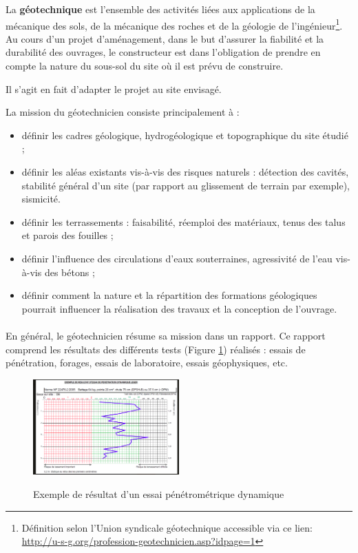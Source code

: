 \par 
La \textbf{géotechnique} est l’ensemble des 
activités liées aux applications de la mécanique des sols, de la mécanique 
des roches et de la géologie de l’ingénieur\footnote{
    Définition selon l’Union syndicale géotechnique accessible via ce lien: 
    \url{http://u-s-g.org/profession-geotechnicien.asp?idpage=1}}.
Au cours d'un projet d'aménagement, dans le but d'assurer  la fiabilité et la durabilité
des ouvrages, le constructeur est dans l'obligation de prendre en compte
la nature du sous-sol du site où il est prévu de construire.

Il s'agit en fait d'adapter le projet au site envisagé.
\par
La mission du géotechnicien consiste principalement à \cite{Chamel}\cite{benachenhou2019approche}:
\begin{itemize}
    \item définir les cadres géologique, hydrogéologique et topographique 
    du site étudié ;
    \item définir les aléas existants vis-à-vis des risques naturels : 
    détection des cavités, stabilité général d’un site (par rapport au 
    glissement de terrain par exemple), sismicité.
    \item définir les terrassements : faisabilité, réemploi des matériaux, 
    tenus des talus et parois des fouilles ;
    \item définir l’influence des circulations d’eaux souterraines, 
    agressivité de l’eau vis-à-vis des bétons ;
    \item définir comment la nature et la répartition des 
    formations géologiques pourrait influencer la réalisation des travaux et la conception 
    de l’ouvrage.
\end{itemize}
\paragraph{}
En général, le géotechnicien résume sa mission dans un rapport.
Ce rapport comprend les résultats des différents tests (Figure \ref{fig:test_penetrometrique}) 
réalisés : essais de pénétration, forages, essais de laboratoire,
essais géophysiques, etc.
\begin{figure}
    \centering
    \includegraphics[width=0.5\textwidth]{images/Contexte/penetrographe.png}
    \caption{Exemple de résultat d'un essai pénétrométrique dynamique }\cite{penetrometrie}
    \label{fig:test_penetrometrique}
\end{figure} 


